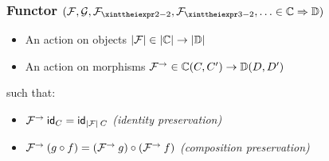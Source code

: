 \documentclass[usenames,dvipsnames,rgb]{beamer}
\newcommand{\sidenote}[1]{\hfill #1}
\newcommand{\law}[1]{\textit{(#1)}}
\begin{document}

\newcommand{\CatFunc}[2]{\ensuremath{#1 \Rightarrow #2}}

\newcommand{\theFunctor}[1]{\mathcal{#1}}
\newcommand{\aFunctor}[1][0]{%
  \ensuremath{%
    \ifthenelse%
        {\equal{#1}{0}}%
        {\theFunctor{F}}%
        {\ifthenelse%
          {\equal{#1}{1}}%
          {\theFunctor{G}}%
          {\theFunctor{F}_{\xinttheiexpr #1 - 2 \relax}}}}}

\newcommand{\FuncObj}[1]{\CatObj{#1}}
\newcommand{\FuncMorph}[1]{#1^{\to}}

\begin{frame}
\frametitle{Functor%
  \sidenote{$(\aFunctor, \aFunctor[1], \aFunctor[2], \aFunctor[3], \ldots \in \CatFunc{\aCategory}{\aCategory[1]})$}}

\begin{itemize}
\item An action on objects $\FuncObj{\aFunctor} \in \CatObj{\aCategory} \to \CatObj{\aCategory[1]}$
\item An action on morphisms $\FuncMorph{\aFunctor} \in \CatMorph[\aCategory]{C}{C'} \to \CatMorph[{\aCategory[1]}]{D}{D'}$
\end{itemize}
such that:
\begin{itemize}
\item $\FuncMorph{\aFunctor}\: \CatId[C] = \CatId[{\FuncObj{\aFunctor}\: C}]$
\sidenote{\law{identity preservation}}
\item $\FuncMorph{\aFunctor}\: (g \circ f) = (\FuncMorph{\aFunctor}\: g) \circ (\FuncMorph{\aFunctor}\: f)$
\sidenote{\law{composition preservation}}
\end{itemize}

\end{frame}

\end{document}
